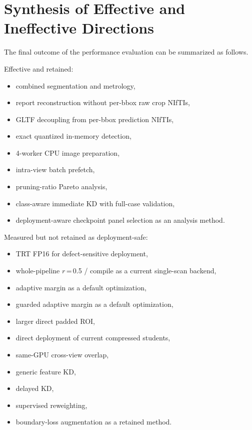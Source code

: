 \hypertarget{synthesis-of-effective-and-ineffective-directions}{%
\section{Synthesis of Effective and Ineffective
Directions}\label{synthesis-of-effective-and-ineffective-directions}}

The final outcome of the performance evaluation can be summarized as
follows.

Effective and retained:

\begin{itemize}
\tightlist
\item
  combined segmentation and metrology,
\item
  report reconstruction without per-bbox raw crop NIfTIs,
\item
  GLTF decoupling from per-bbox prediction NIfTIs,
\item
  exact quantized in-memory detection,
\item
  4-worker CPU image preparation,
\item
  intra-view batch prefetch,
\item
  pruning-ratio Pareto analysis,
\item
  class-aware immediate KD with full-case validation,
\item
  deployment-aware checkpoint panel selection as an analysis method.
\end{itemize}

Measured but not retained as deployment-safe:

\begin{itemize}
\tightlist
\item
  TRT FP16 for defect-sensitive deployment,
\item
  whole-pipeline $r$\,=\,0.5 / compile as a current single-scan
  backend,
\item
  adaptive margin as a default optimization,
\item
  guarded adaptive margin as a default optimization,
\item
  larger direct padded ROI,
\item
  direct deployment of current compressed students,
\item
  same-GPU cross-view overlap,
\item
  generic feature KD,
\item
  delayed KD,
\item
  supervised reweighting,
\item
  boundary-loss augmentation as a retained method.
\end{itemize}

